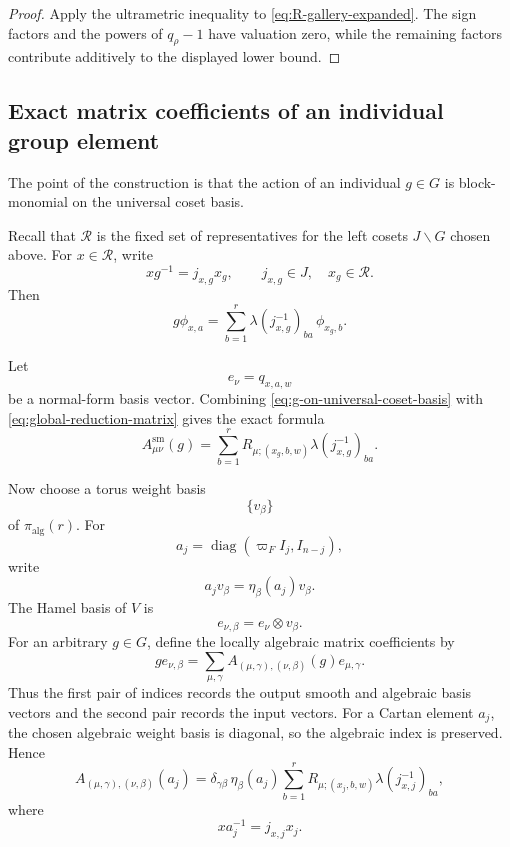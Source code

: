 \documentclass[12pt]{article}
\theoremstyle{definition}
\theoremstyle{remark}
\begin{document}
\begin{proof}
Apply the ultrametric inequality to
\eqref{eq:R-gallery-expanded}.  The sign factors and the powers of
\(q_\rho-1\) have valuation zero, while the remaining factors contribute
additively to the displayed lower bound.
\end{proof}

\subsection{Exact matrix coefficients of an individual group element}

The point of the construction is that the action of an individual
\(g\in G\) is block-monomial on the universal coset basis.

Recall that $\mathscr R$ is the fixed set of representatives for the left cosets $J\backslash G$ chosen above.  For $x\in\mathscr R$, write
\[
 xg^{-1}=j_{x,g}x_g,
 \qquad
 j_{x,g}\in J,
 \quad
 x_g\in\mathscr R.
\]
Then
\begin{equation}\label{eq:g-on-universal-coset-basis}
 g\phi_{x,a}
 =
 \sum_{b=1}^r
 \lambda(j_{x,g}^{-1})_{ba}\,
 \phi_{x_g,b}.
\end{equation}

Let
\[
 e_\nu=q_{x,a,w}
\]
be a normal-form basis vector.  Combining
\eqref{eq:g-on-universal-coset-basis} with
\eqref{eq:global-reduction-matrix} gives the exact formula
\begin{equation}\label{eq:exact-smooth-matrix-coefficient}
 \boxed{
 A^{\mathrm{sm}}_{\mu\nu}(g)
 =
 \sum_{b=1}^r
 R_{\mu;(x_g,b,w)}
 \lambda(j_{x,g}^{-1})_{ba}.
 }
\end{equation}

Now choose a torus weight basis
\[
 \{v_\beta\}
\]
of \(\pi_{\mathrm{alg}}(r)\).  For
\[
 a_j=\operatorname{diag}(\varpi_FI_j,I_{n-j}),
\]
write
\[
 a_jv_\beta=\eta_\beta(a_j)v_\beta.
\]
The Hamel basis of \(V\) is
\[
 e_{\nu,\beta}=e_\nu\otimes v_\beta.
\]
For an arbitrary $g\in G$, define the locally algebraic matrix coefficients by
\begin{equation}\label{eq:definition-locally-algebraic-A}
 g e_{\nu,\beta}
 =\sum_{\mu,\gamma}
 A_{(\mu,\gamma),(\nu,\beta)}(g)e_{\mu,\gamma}.
\end{equation}
Thus the first pair of indices records the output smooth and algebraic basis
vectors and the second pair records the input vectors.  For a Cartan element
$a_j$, the chosen algebraic weight basis is diagonal, so the algebraic index
is preserved.  Hence
\begin{equation}\label{eq:exact-locally-algebraic-matrix-coefficient}
 \boxed{
 A_{(\mu,\gamma),(\nu,\beta)}(a_j)
 =
 \delta_{\gamma\beta}\,
 \eta_\beta(a_j)
 \sum_{b=1}^r
 R_{\mu;(x_j,b,w)}
 \lambda(j_{x,j}^{-1})_{ba},
 }
\end{equation}
where
\[
 xa_j^{-1}=j_{x,j}x_j.
\]
\end{document}
